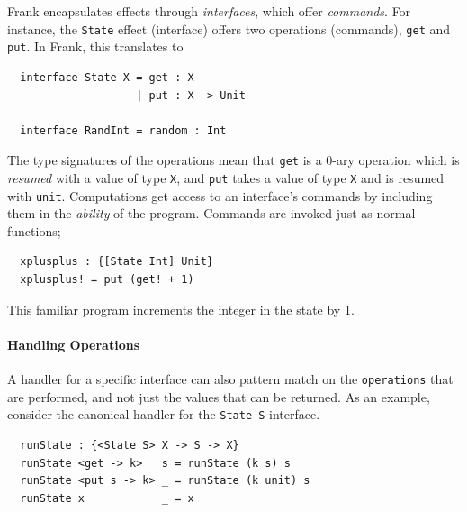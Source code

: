\documentclass[msc,deptreport,cs]{infthesis} %
\newcommand{\code}[1]{\lstinline{#1}}
\begin{document}
Frank encapsulates effects through \emph{interfaces}, which offer
\emph{commands}. For instance, the \code{State} effect (interface) offers two
operations (commands), \code{get} and \code{put}. In Frank, this translates to

\begin{lstlisting}
  interface State X = get : X
                    | put : X -> Unit

  interface RandInt = random : Int
\end{lstlisting}

The type signatures of the operations mean that \code{get} is a 0-ary operation
which is \emph{resumed} with a value of type \code{X}, and \code{put} takes a
value of type \code{X} and is resumed with \code{unit}. Computations get access
to an interface's commands by including them in the \emph{ability} of the
program. Commands are invoked just as normal functions;

\begin{lstlisting}
  xplusplus : {[State Int] Unit}
  xplusplus! = put (get! + 1)
\end{lstlisting}

\noindent This familiar program increments the integer in the state by 1.

\paragraph*{Handling Operations}


A handler for a specific interface can also pattern match on the
\code{operations} that are performed, and not just the values that can be
returned. As an example, consider the canonical handler for the \code{State S}
interface.

\begin{lstlisting}
  runState : {<State S> X -> S -> X}
  runState <get -> k>   s = runState (k s) s
  runState <put s -> k> _ = runState (k unit) s
  runState x            _ = x
\end{lstlisting}
\end{document}
